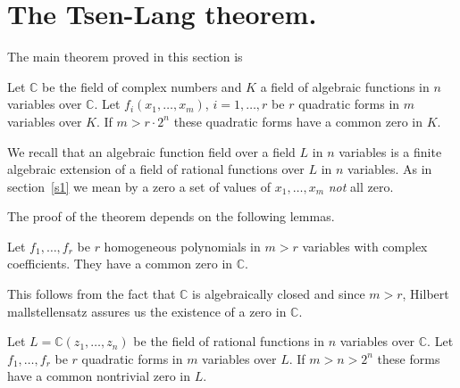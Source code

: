 \section{The Tsen-Lang theorem.}\label{s5}

The main theorem proved in this section is 

\begin{thm}\label{thm12}
Let $\mathbb{C}$ be the field of complex numbers and $K$ a field of
algebraic functions in $n$ variables over $\mathbb{C}$. Let
$f_i(x_1,\ldots,x_m)$, $i=1,\ldots,r$ be $r$ quadratic forms in $m$
variables over $K$. If $m>r\cdot 2^{n}$ these quadratic forms have a
common zero in $K$.
\end{thm}

We recall that an algebraic function field over a field $L$ in $n$
variables is a finite algebraic extension of a field of rational
functions over $L$ in $n$ variables. As in section~\ref{s1} we mean by
a zero a set of values of $x_1,\ldots,x_m$ \textit{not} all zero.

The proof of the theorem depends on the following lemmas.

\begin{lem}\label{lem4}
Let $f_1,\ldots,f_r$ be $r$ homogeneous polynomials in $m>r$ variables
with complex coefficients. They have a common zero in $\mathbb{C}$. 

This follows from the fact that $\mathbb{C}$ is algebraically closed
and since $m>r$, Hilbert mallstellensatz assures us the existence of a
zero in $\mathbb{C}$.
\end{lem}

\begin{lem}\label{lem5}
Let $L=\mathbb{C}(z_1,\ldots,z_n)$ be the field of rational functions
in $n$ variables over $\mathbb{C}$. Let $f_1,\ldots,f_r$ be $r$
quadratic forms in $m$ variables over $L$. If $m>n>2^{n}$ these forms
have a common nontrivial zero in $L$.
\end{lem}

